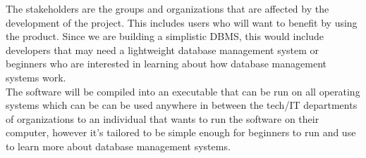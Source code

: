 \documentclass[12pt,letterpaper]{article}
\begin{document}
The stakeholders are the groups and organizations that are affected by the development of the project. This includes users who will want to benefit by using the product. Since we are building a simplistic DBMS, this would include developers that may need a lightweight database management system or beginners who are interested in learning about how database management systems work.\\ 

\noindent The software will be compiled into an executable that can be run on all operating systems which can be can be used anywhere in between the tech/IT departments of organizations to an individual that wants to run the software on their computer, however it's tailored to be simple enough for beginners to run and use to learn {\color{red}more about database management systems}.
\end{document}
